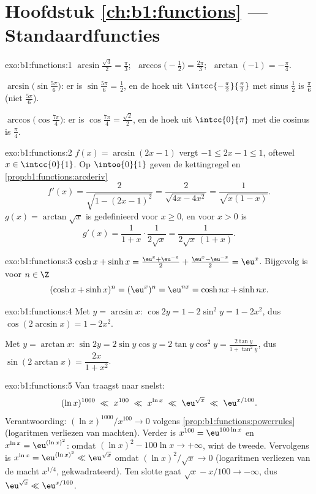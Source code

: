 \section*{Hoofdstuk \ref{ch:b1:functions} --- Standaardfuncties}

\begin{solution}{exo:b1:functions:1}
$\arcsin\frac{\sqrt 3}{2} = \frac\pi3$;
$\;\arccos\bigl(-\frac12\bigr) = \frac{2\pi}{3}$;
$\;\arctan(-1) = -\frac\pi4$.

$\arcsin\bigl(\sin\frac{5\pi}{6}\bigr)$: er is $\sin\frac{5\pi}{6} =
\frac12$, en de hoek uit $\intcc{-\frac\pi2}{\frac\pi2}$ met sinus
$\frac12$ is $\frac\pi6$ (niet $\frac{5\pi}{6}$).

$\arccos\bigl(\cos\frac{7\pi}{4}\bigr)$: er is $\cos\frac{7\pi}{4} =
\frac{\sqrt 2}{2}$, en de hoek uit $\intcc{0}{\pi}$ met die cosinus is
$\frac\pi4$.
\end{solution}

\begin{solution}{exo:b1:functions:2}
$f(x) = \arcsin(2x - 1)$ vergt $-1 \leq 2x - 1 \leq 1$, oftewel $x \in
\intcc{0}{1}$. Op $\intoo{0}{1}$ geven de kettingregel en
\cref{prop:b1:functions:arcderiv}
\[
f'(x) = \frac{2}{\sqrt{1 - (2x-1)^2}} = \frac{2}{\sqrt{4x - 4x^2}}
= \frac{1}{\sqrt{x(1 - x)}} .
\]
$g(x) = \arctan\sqrt x$ is gedefinieerd voor $x \geq 0$, en voor $x > 0$
is
\[
g'(x) = \frac{1}{1 + x} \cdot \frac{1}{2\sqrt x}
= \frac{1}{2\sqrt x\,(1 + x)} .
\]
\end{solution}

\begin{solution}{exo:b1:functions:3}
$\cosh x + \sinh x = \frac{\eu^x + \eu^{-x}}{2} + \frac{\eu^x -
\eu^{-x}}{2} = \eu^x$. Bijgevolg is voor $n \in \Z$
\[
(\cosh x + \sinh x)^n = (\eu^x)^n = \eu^{nx}
= \cosh nx + \sinh nx .
\]
\end{solution}

\begin{solution}{exo:b1:functions:4}
Met $y = \arcsin x$: $\cos 2y = 1 - 2\sin^2 y = 1 - 2x^2$, dus
$\cos(2\arcsin x) = 1 - 2x^2$.

Met $y = \arctan x$: $\sin 2y = 2 \sin y \cos y = 2 \tan y \cos^2 y =
\frac{2\tan y}{1 + \tan^2 y}$, dus $\sin(2\arctan x) =
\dfrac{2x}{1 + x^2}$.
\end{solution}

\begin{solution}{exo:b1:functions:5}
Van traagst naar snelst:
\[
(\ln x)^{1000} \;\ll\; x^{100} \;\ll\; x^{\ln x} \;\ll\;
\eu^{\sqrt x} \;\ll\; \eu^{x/100} .
\]
Verantwoording: $(\ln x)^{1000}/x^{100} \to 0$ volgens
\cref{prop:b1:functions:powerrules} (logaritmen verliezen van machten).
Verder is $x^{100} = \eu^{100\ln x}$ en $x^{\ln x} = \eu^{(\ln x)^2}$:
omdat $(\ln x)^2 - 100\ln x \to +\infty$, wint de tweede. Vervolgens is
$x^{\ln x} = \eu^{(\ln x)^2} \ll \eu^{\sqrt x}$ omdat $(\ln x)^2/\sqrt x
\to 0$ (logaritmen verliezen van de macht $x^{1/4}$, gekwadrateerd). Ten
slotte gaat $\sqrt x - x/100 \to -\infty$, dus $\eu^{\sqrt x} \ll
\eu^{x/100}$.
\end{solution}

